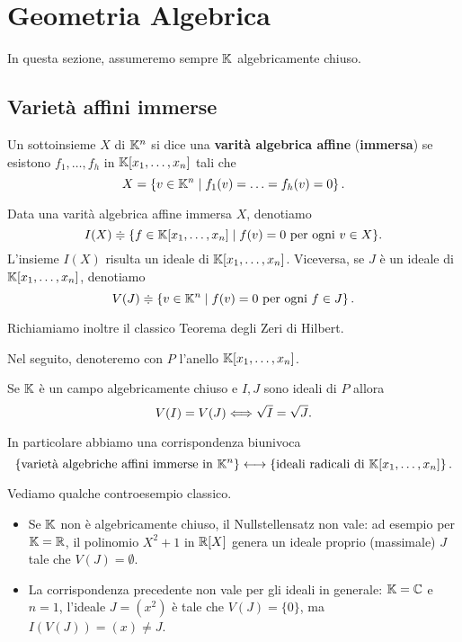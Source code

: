 \chapter{Geometria Algebrica}
In questa sezione, assumeremo sempre $\mathbb{K}$ algebricamente chiuso.

\section{Variet\`a affini immerse}
\begin{definition}
    Un sottoinsieme $X$ di $\mathbb{K}^n$ si dice una \textbf{varità algebrica affine} (\textbf{immersa}) se esistono $f_1,\dots,f_h$ in $\mathbb{K}[x_1,\dots,x_n]$ tali che 
	\[X=\left\{{v\in \mathbb{K}^n \mid f_1(v)=\ldots=f_h(v)=0}\right\}.\]
\end{definition}
Data una varità algebrica affine immersa $X$, denotiamo \[I(X)\doteqdot\{f\in \mathbb{K}[x_1,\dots,x_n] \mid f(v)=0 \text{ per ogni } v\in X  \}.\]
L'insieme $I(X)$ risulta un ideale di $\mathbb{K}[x_1,\dots,x_n]$. Viceversa, se $J$ è un ideale di $ \mathbb{K}[x_1,\dots,x_n]$, denotiamo \[V(J)\doteqdot\left\{v\in \mathbb{K}^n \mid f(v)=0 \text{ per ogni } f\in J\right\}.\]

Richiamiamo inoltre il classico Teorema degli Zeri di Hilbert. 
\begin{notation}
    Nel seguito, denoteremo con $P$ l'anello $\mathbb{K}[x_1,\dots,x_n]$.
\end{notation}

\begin{theorem}[Nullstellensatz]
Se $\mathbb{K}$ \`e un campo algebricamente chiuso e $I,J$ sono ideali di $P$ allora 
\[V(I)=V(J)\Longleftrightarrow \sqrt I=\sqrt J.\]
\end{theorem}
In particolare abbiamo una corrispondenza biunivoca \[\left\{\text{varietà algebriche affini immerse in $\mathbb{K}^n$} \right\} \longleftrightarrow \left\{\text{ideali radicali di $\mathbb{K}[x_1,\dots,x_n]$}\right\}.\]

\begin{example} Vediamo qualche controesempio classico.
\begin{itemize}
    \item Se $\mathbb{K}$ non è algebricamente chiuso, il Nullstellensatz non vale: ad esempio per $\mathbb{K}=\mathbb{R}$, il polinomio $X^2+1$ in $\mathbb{R}[X]$ genera un ideale proprio (massimale) $J$ tale che $V(J)=\emptyset$.
    \item La corrispondenza precedente non vale per gli ideali in generale: $\mathbb{K}=\mathbb{C}$ e $n=1$, l'ideale $J=(x^2)$ è tale che $V(J)=\{0\}$, ma $I(V(J))=(x)\ne J$.
\end{itemize}
\end{example}

